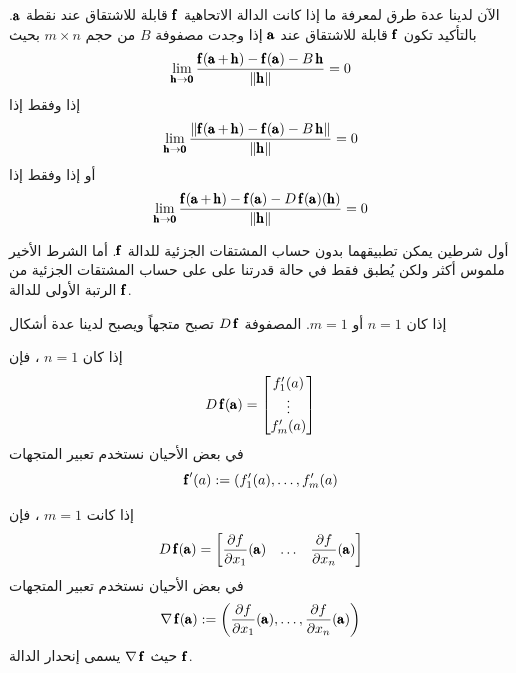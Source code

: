 \begin{note}
    الآن لدينا عدة طرق لمعرفة ما إذا كانت الدالة الاتحاهية $\f$ قابلة للاشتقاق عند نقطة $\A$. بالتأكيد تكون $\f$ قابلة للاشتقاق عند $\A$ إذا وجدت مصفوفة $B$ من حجم $m\times n$ بحيث
\[
\lim\limits_{\h\to\Bzero}\frac{\f(\A+\h)-\f(\A)-B\h}{\norm{\h}}=0
\]
إذا وفقط إذا
\[
\lim\limits_{\h\to\Bzero}\frac{\norm{\f(\A+\h)-\f(\A)-B\h}}{\norm{\h}}=0
\]
أو إذا وفقط إذا
\begin{equation}
    \label{eq:differentiability_second_eq}
\lim\limits_{\h\to\Bzero}\frac{\f(\A+\h)-\f(\A)-D\f(\A)(\h)}{\norm{\h}}=0
\end{equation}
\end{note}

\begin{note}
    أول شرطين يمكن تطبيقهما بدون حساب المشتقات الجزئية للدالة $\f$. أما الشرط الأخير ملموس أكثر ولكن يُطبق فقط في حالة قدرتنا على على حساب المشتقات الجزئية من الرتبة الأولى للدالة $\f$.
\end{note}

\begin{note}
    إذا كان $n=1$ أو $m=1$. المصفوفة $D\f$ تصبح متجهاً ويصبح لدينا عدة أشكال
    \begin{tasks}
    \task[(i]   إذا كان $n=1$ ، فإن
\[
D\f(\A)=\begin{bmatrix}
    f_1'(a)\\
    \vdots\\
    f_m'(a)
\end{bmatrix}
\]
في بعض الأحيان نستخدم تعبير المتجهات
\[
\f'(a):=(f_1'(a),\dots,f_m'(a)
\]

\task[(ii] إذا كانت $m=1$ ، فإن 
\[
D\f(\A)=\begin{bmatrix}\pder{f}{x_1}(\A)&\dots&\pder{f}{x_n}(\A)
\end{bmatrix}
\]
في بعض الأحيان نستخدم تعبير المتجهات
\[
\nabla \f(\A):=\pbracket{\pder{f}{x_1}(\A),\dots,\pder{f}{x_n}(\A)}
\]
حيث $\nabla\f$ يسمى إنحدار الدالة $\f$.
    \end{tasks}
\end{note}


